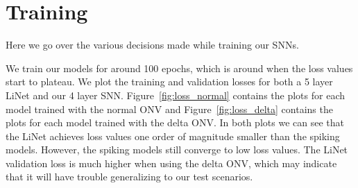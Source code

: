 \documentclass [MS] {UCLAthesis}
\begin{document}
% 
% 

% 



\section{Training}

Here we go over the various decisions made while training our SNNs.

We train our models for around 100 epochs, which is around when the loss values start to plateau. We plot the training and validation losses for both a 5 layer LiNet and our 4 layer SNN. Figure~\ref{fig:loss_normal} contains the plots for each model trained with the normal ONV and Figure~\ref{fig:loss_delta} contains the plots for each model trained with the delta ONV. In both plots we can see that the LiNet achieves loss values one order of magnitude smaller than the spiking models. However, the spiking models still converge to low loss values. The LiNet validation loss is much higher when using the delta ONV, which may indicate that it will have trouble generalizing to our test scenarios.
\end{document}
